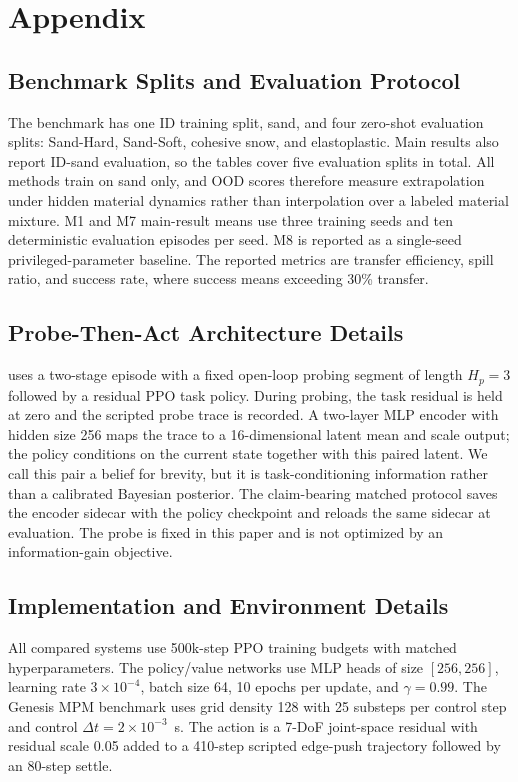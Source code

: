 \section{Appendix}

\subsection{Benchmark Splits and Evaluation Protocol}
The benchmark has one ID training split, sand, and four zero-shot evaluation splits: Sand-Hard, Sand-Soft, cohesive snow, and elastoplastic. Main results also report ID-sand evaluation, so the tables cover five evaluation splits in total. All methods train on sand only, and OOD scores therefore measure extrapolation under hidden material dynamics rather than interpolation over a labeled material mixture. M1 and M7 main-result means use three training seeds and ten deterministic evaluation episodes per seed. M8 is reported as a single-seed privileged-parameter baseline. The reported metrics are transfer efficiency, spill ratio, and success rate, where success means exceeding 30\% transfer.

\subsection{Probe-Then-Act Architecture Details}
\PTA{} uses a two-stage episode with a fixed open-loop probing segment of length $H_p=3$ followed by a residual PPO task policy. During probing, the task residual is held at zero and the scripted probe trace is recorded. A two-layer MLP encoder with hidden size 256 maps the trace to a 16-dimensional latent mean and scale output; the policy conditions on the current state together with this paired latent. We call this pair a belief for brevity, but it is task-conditioning information rather than a calibrated Bayesian posterior. The claim-bearing matched protocol saves the encoder sidecar with the policy checkpoint and reloads the same sidecar at evaluation. The probe is fixed in this paper and is not optimized by an information-gain objective.

\subsection{Implementation and Environment Details}
All compared systems use 500k-step PPO training budgets with matched hyperparameters. The policy/value networks use MLP heads of size $[256,256]$, learning rate $3\times 10^{-4}$, batch size 64, 10 epochs per update, and $\gamma=0.99$. The Genesis MPM benchmark uses grid density 128 with 25 substeps per control step and control $\Delta t = 2\times10^{-3}$~s. The action is a 7-DoF joint-space residual with residual scale 0.05 added to a 410-step scripted edge-push trajectory followed by an 80-step settle.

